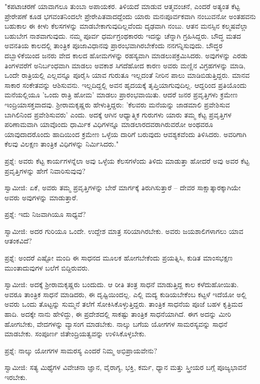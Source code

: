 "ಕಪಟಾಚರಣೆ ಯಾವಾಗಲೂ ತುಂಬಾ ಅಪಾಯಕರ. ತಿಳಿಯದೆ ಮಾಡುವ ಆತ್ಮವಂಚನೆ, ಎಂದರೆ ಅತ್ಯಂತ ಕೆಟ್ಟ ಪ್ರೇರೇಪಣೆ ಕೂಡ ಭಗವಂತನಿಂದಲೇ ಪ್ರೇರೇಪಿತವಾದದ್ದೆಂದು ಯಾರು ಮನಃಪೂರ್ವಕವಾಗಿ ನಂಬುವನೋ ಅಂತಹವನು ಬಹುಕಾಲ ಈ ಕೀಳು ಕೆಲಸಗಳನ್ನು ಮಾಡಬೇಕಾಗುವುದಿಲ್ಲವೆಂದು ದೃಢವಾಗಿ ನಂಬು. ಆತನ ಮನಸ್ಸಿನ ಕಲ್ಮಷವೆಲ್ಲಾ ಬಹುಬೇಗ ನಾಶವಾಗುವುದು. ನಮ್ಮ ಪೂರ್ವ ಧರ್ಮಗ್ರಂಥಕಾರರು ಇದನ್ನು ಚೆನ್ನಾಗಿ ಗ್ರಹಿಸಿದ್ದರು. ಬೌದ್ಧ ಮತದ ಅವನತಿಯ ಕಾಲದಲ್ಲಿ ತಾಂತ್ರಿಕ ಪೂಜಾವಿಧಾನವು ಪ್ರಾರಂಭವಾಗಿರಬೇಕೆಂದು ನನಗನ್ನಿಸುವುದು. ಬೌದ್ಧರ ದಬ್ಬಾಳಿಕೆಯಿಂದ ಜನರು ವೇದ ಕಾಲದ ಹೋಮಗಳನ್ನು ರಹಸ್ಯವಾಗಿ ಮಾಡಲುಪಕ್ರಮಿಸಿದರು. ಅವುಗಳನ್ನು ಎರಡು ತಿಂಗಳವರೆಗೆ ಅನಿರ್ಬಂಧವಾಗಿ ಮಾಡಲು ಅವಕಾಶ ಸಿಗದೆಹೋದ ಕಾರಣ ಅವರು ಮಣ್ಣಿನ ವಿಗ್ರಹಗಳನ್ನು ಮಾಡಿ, ಒಂದೇ ರಾತ್ರಿಯಲ್ಲಿ ಎಲ್ಲವನ್ನೂ ಪೂರೈಸಿ ಯಾವ ಗುರುತೂ ಇಲ್ಲದಂತೆ ನೀರಿನ ಪಾಲು ಮಾಡಿಬಿಡುತ್ತಿದ್ದರು. ಮಾನವ ಸಾಕಾರ ಸಂಕೇತವನ್ನು ಆಶಿಸುವನು. ಇಲ್ಲದಿದ್ದಲ್ಲಿ ಅವನ ಹೃದಯಕ್ಕೆ ತೃಪ್ತಿಯಾಗುವುದಿಲ್ಲ. ಆದ್ದರಿಂದ ಪ್ರತಿಯೊಂದು ಮನೆಯಲ್ಲಿಯೂ 'ಒಂದು ರಾತ್ರಿ ಹೋಮ' ಮಾಡಲು ಪ್ರಾರಂಭವಾಯಿತು. ಆದರೆ ಜನರ ಪ್ರವೃತ್ತಿಗಳು ಕ್ರಮೇಣ ಇಂದ್ರಿಯಾಸಕ್ತವಾದವು. ಶ‍್ರೀರಾಮಕೃಷ್ಣರು ಹೇಳುತ್ತಿದ್ದರು: 'ಕೆಲವರು ಮನೆಯನ್ನು ಜಾಡಮಾಲಿ ಪ್ರವೇಶಿಸುವ ಬಾಗಿಲಿನಿಂದ ಪ್ರವೇಶಿಸುವರು' ಎಂದು. ಅದಕ್ಕೆ ಆಗಿನ ಆಧ್ಯಾತ್ಮಿಕ ಗುರುಗಳು ಯಾರು ತಮ್ಮ ಕೆಟ್ಟ ಪ್ರವೃತ್ತಿಗಳ ಪರಿಣಾಮವಾಗಿ ಯಾವೊಂದು ಧಾರ್ಮಿಕ ವಿಧಿಗಳನ್ನೂ ಮಾಡಲಾರದವರಾಗಿರುವರೋ ಅಂಥವರೂ ಯಾವುದಾದರೊಂದು ಹಾದಿಯಿಂದ ಕ್ರಮೇಣ ಒಳ್ಳೆಯ ದಾರಿಗೆ ಬರುವುದು ಆವಶ್ಯಕವೆಂದು ತಿಳಿಸಿದರು. ಅವರಿಗಾಗಿ ಕೆಲವು ವಿಲಕ್ಷಣ ತಾಂತ್ರಿಕ ವಿಧಿಗಳನ್ನು ನಿರ್ಮಿಸಿದರು."

ಪ್ರಶ್ನೆ: ಅವರು ಕೆಟ್ಟ ಕಾರ್ಯಗಳನ್ನೆಲಾ ಅವು ಒಳ್ಳೆಯ ಕೆಲಸಗಳೆಂದು ತಿಳಿದು ಮಾಡುತ್ತಾ ಹೋದರೆ ಅವು ಅವರ ಕೆಟ್ಟ ಪ್ರವೃತ್ತಿಗಳನ್ನು ಹೇಗೆ ನಿವಾರಿಸುವುವು?

ಸ್ವಾಮೀಜಿ: ಏಕೆ, ಅವರು ತಮ್ಮ ಪ್ರವೃತ್ತಿಗಳನ್ನು ಬೇರೆ ಮಾರ್ಗಕ್ಕೆ ತಿರುಗಿಸುತ್ತಾರೆ – ದೇವರ ಸಾಕ್ಷಾತ್ಕಾರಕ್ಕಾಗಿಯೇ ಅವರು ಅವುಗಳನ್ನು ಮಾಡುತ್ತಾರೆ.

ಪ್ರಶ್ನೆ: ಇದು ನಿಜವಾಗಿಯೂ ಸಾಧ್ಯವೆ?

ಸ್ವಾಮೀಜಿ: ಅದರ ಗುರಿಯೂ ಒಂದೇ. ಉದ್ದೇಶ ಮಾತ್ರ ಸರಿಯಾಗಿರಬೇಕು. ಅವರು ಜಯಶಾಲಿಗಳಾಗಲು ಯಾವ ಆತಂಕವಿದೆ?

ಪ್ರಶ್ನೆ: ಅಂದರೆ ಎಷ್ಟೋ ಮಂದಿ ಈ ಸಾಧನದ ಮೂಲಕ ಹೋಗಬೇಕೆಂದು ಪ್ರಯತ್ನಿಸಿ, ಕುಡಿತ ಮಾಂಸಭಕ್ಷಣ ಮುಂತಾದುವುಗಳ ಬಲೆಗೆ ಬಿದ್ದಿರುವರು.

ಸ್ವಾಮೀಜಿ: ಅದಕ್ಕೆ ಶ‍್ರೀರಾಮಕೃಷ್ಣರು ಬಂದುದು. ಆ ರೀತಿ ತಂತ್ರ ಸಾಧನೆ ಮಾಡುತ್ತಿದ್ದ ಕಾಲ ಕಳೆದುಹೋಯಿತು. ಅವರೂ ತಾಂತ್ರಿಕ ಸಾಧನೆ ಮಾಡಿದರು, ಈ ದೃಷ್ಟಿಯಿಂದಲ್ಲ. ಎಲ್ಲಿ ಮದ್ಯ ಕುಡಿಯಬೇಕೆಂಬ ಕಟ್ಟಳೆ ಇದೆಯೋ ಅಲ್ಲಿ ಅವರು ಒಂದು ತೊಟ್ಟನ್ನು ಸುಮ್ಮನೆ ತಲೆಗೆ ಸೋಕಿಸಿಕೊಳ್ಳುತ್ತಿದ್ದರು. ತಾಂತ್ರಿಕ ಸಾಧನೆಯ ಪೂಜೆ ಬಹಳ ಕೃತ್ರಿಮದ ಹಾದಿ. ಅದಕ್ಕೇ ನಾನು ಹೇಳಿದ್ದು, ಈ ಪ್ರದೇಶದಲ್ಲಿ ಸಾಕಷ್ಟು ತಾಂತ್ರಿಕ ಸಾಧನೆಯಾಗಿದೆ. ಈಗ ಅದನ್ನು ಮೀರಿ ಹೋಗಬೇಕು, ವೇದಗಳನ್ನು ವ್ಯಾಸಂಗ ಮಾಡಬೇಕು. ನಾಲ್ಕು ಬಗೆಯ ಯೋಗಗಳ ಸಾಮರಸ್ಯವನ್ನು ಸಾಧನೆ ಮಾಡಬೇಕು. ಸಂಪೂರ್ಣ ಜಿತೇಂದ್ರಿಯತ್ವವನ್ನು ಉಳಿಸಿಕೊಳ್ಳಬೇಕು.

ಪ್ರಶ್ನೆ: ನಾಲ್ಕು ಯೋಗಗಳ ಸಾಮರಸ್ಯ ಎಂದರೆ ನಿಮ್ಮ ಅಭಿಪ್ರಾಯವೇನು?

ಸ್ವಾಮೀಜಿ: ಸತ್ಯ ಮಿಥ್ಯೆಗಳ ವಿವೇಚನಾ ಜ್ಞಾನ, ವೈರಾಗ್ಯ, ಭಕ್ತಿ, ಕರ್ಮ, ಧ್ಯಾನ ಮತ್ತು ಸ್ತ್ರೀಯರ ಬಗ್ಗೆ ಪೂಜ್ಯಭಾವನೆ ಇರಬೇಕು.


